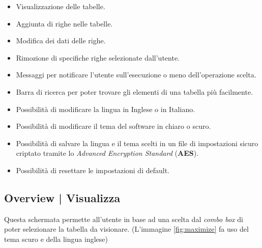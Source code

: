 \begin{itemize}
	\item \textsf{\small Visualizzazione delle tabelle.}
	\item \textsf{\small Aggiunta di righe nelle tabelle.}
	\item \textsf{\small Modifica dei dati delle righe.}
	\item \textsf{\small Rimozione di specifiche righe selezionate dall'utente.}
	\item \textsf{\small Messaggi per notificare l'utente sull'esecuzione o meno dell'operazione scelta.}
	\item \textsf{\small Barra di ricerca per poter trovare gli elementi di una tabella più facilmente.}
	\item \textsf{\small Possibilità di modificare la lingua in Inglese o in Italiano.}
	\item \textsf{\small Possibilità di modificare il tema del software in chiaro o scuro.}
	\item \textsf{\small Possibilità di salvare la lingua e il tema scelti in un file di impostazioni sicuro criptato tramite lo \emph{Advanced Encryption Standard} (\textbf{AES}).}
	\item \textsf{\small Possibilità di resettare le impostazioni di default.}
\end{itemize}


\newpage

\enlargethispage{1\linewidth}

\subsection{Overview | Visualizza}

\textsf{\small Questa schermata permette all'utente in base ad una scelta dal \emph{combo box} di poter selezionare la tabella da visionare. (L'immagine \ref{fig:maximize} fa uso del tema scuro e della lingua inglese)}\\

